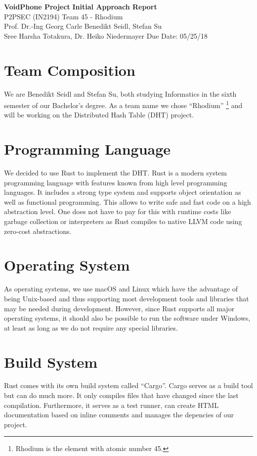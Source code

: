 \documentclass[a4paper, 11pt]{article}
\begin{document}
\noindent
\large\textbf{VoidPhone Project} \hfill \textbf{Initial Approach Report} \\
\normalsize P2PSEC (IN2194)  \hfill Team 45 - Rhodium\\
Prof. Dr.-Ing Georg Carle \hfill Benedikt Seidl, Stefan Su \\
Sree Harsha Totakura, Dr. Heiko Niedermayer \hfill Due Date: 05/25/18

\section*{Team Composition}
We are Benedikt Seidl and Stefan Su, both studying Informatics in the sixth semester of our Bachelor's degree. As a team name we chose ``Rhodium'' \footnote{Rhodium is the element with atomic number 45.} and will be working on the Distributed Hash Table (DHT) project.

\section*{Programming Language}
We decided to use Rust \cite{Rust} to implement the DHT. Rust is a modern system programming language with features known from high level programming languages. It includes a strong type system and supports object orientation as well as functional programming. This allows to write safe and fast code on a high abstraction level. One does not have to pay for this with runtime costs like garbage collection or interpreters as Rust compiles to native LLVM code using zero-cost abstractions. \cite{RustFAQ}

\section*{Operating System}
As operating systems, we use macOS and Linux which have the advantage of being Unix-based and thus supporting most development tools and libraries that may be needed during development. However, since Rust supports all major operating systems, it should also be possible to run the software under Windows, at least as long as we do not require any special libraries.

\section*{Build System}
Rust comes with its own build system called ``Cargo''. \cite{CargoBook} Cargo serves as a build tool but can do much more. It only compiles files that have changed since the last compilation. Furthermore, it serves as a test runner, can create HTML documentation based on inline comments and manages the depencies of our project.
\end{document}
